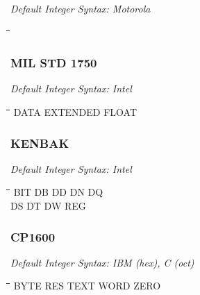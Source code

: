 {\em Default Integer Syntax: Motorola}

{\tt\begin{tabbing}
\hspace{3cm}\=\hspace{3cm}\=\hspace{3cm}\=\hspace{3cm}\=\kill
\end{tabbing}}

\subsubsection{MIL STD 1750}

{\em Default Integer Syntax: Intel}

{\tt\begin{tabbing}
\hspace{3cm}\=\hspace{3cm}\=\hspace{3cm}\=\hspace{3cm}\=\kill
DATA       \> EXTENDED    \> FLOAT \\
\end{tabbing}}

\subsubsection{KENBAK}

{\em Default Integer Syntax: Intel}

{\tt\begin{tabbing}
\hspace{3cm}\=\hspace{3cm}\=\hspace{3cm}\=\hspace{3cm}\=\kill
BIT        \> DB          \> DD          \> DN          \> DQ \\
DS         \> DT          \> DW          \> REG \\
\end{tabbing}}

\subsubsection{CP1600}

{\em Default Integer Syntax: IBM (hex), C (oct) }

{\tt\begin{tabbing}
\hspace{3cm}\=\hspace{3cm}\=\hspace{3cm}\=\hspace{3cm}\=\kill
BYTE       \> RES         \> TEXT        \> WORD       \> ZERO \\
\end{tabbing}}
